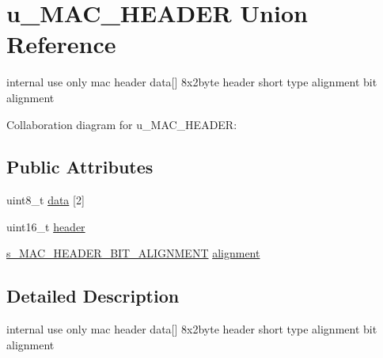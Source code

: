 \hypertarget{unionu__MAC__HEADER}{\section{u\+\_\+\+M\+A\+C\+\_\+\+H\+E\+A\+D\+E\+R Union Reference}
\label{unionu__MAC__HEADER}
}


internal use only mac header data\mbox{[}\mbox{]} 8x2byte header short type alignment bit alignment  




Collaboration diagram for u\+\_\+\+M\+A\+C\+\_\+\+H\+E\+A\+D\+E\+R\+:
\subsection*{Public Attributes}
\begin{DoxyCompactItemize}
\item 
uint8\+\_\+t \hyperlink{unionu__MAC__HEADER_ad8cc8f1178fe6e616e95b32d18374853}{data} \mbox{[}2\mbox{]}
\item 
uint16\+\_\+t \hyperlink{unionu__MAC__HEADER_add55dd877a63f66da16c1a094e473cca}{header}
\item 
\hyperlink{structs__MAC__HEADER__BIT__ALIGNMENT}{s\+\_\+\+M\+A\+C\+\_\+\+H\+E\+A\+D\+E\+R\+\_\+\+B\+I\+T\+\_\+\+A\+L\+I\+G\+N\+M\+E\+N\+T} \hyperlink{unionu__MAC__HEADER_a1c739e4633999a0e405773cbf6a8325e}{alignment}
\end{DoxyCompactItemize}


\subsection{Detailed Description}
internal use only mac header data\mbox{[}\mbox{]} 8x2byte header short type alignment bit alignment 

